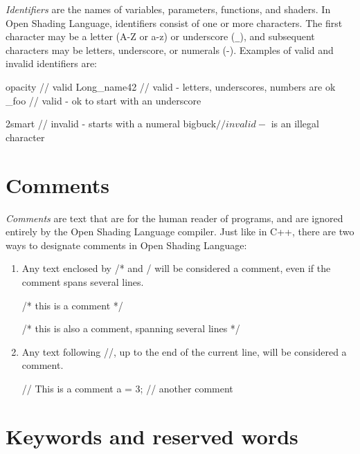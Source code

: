 \documentclass[11pt,letterpaper]{book}
\def\langname{Open Shading Language\xspace}
\begin{document}
\emph{Identifiers} are the names of variables, parameters, functions,
and shaders.  In \langname, identifiers consist of one or more
characters.  The first character may be a letter ({\cf A}-{\cf Z} or
{\cf a}-{\cf z}) or underscore (\verb|_|), and subsequent characters may
be letters, underscore, or numerals ({}-{}).  Examples of
valid and invalid identifiers are:

\begin{code}
    opacity       // valid
    Long_name42   // valid - letters, underscores, numbers are ok
    _foo          // valid - ok to start with an underscore

    2smart        // invalid - starts with a numeral
    bigbuck$      // invalid - $ is an illegal character
\end{code}


\section{Comments}
\label{sec:comments}

\emph{Comments} are text that are for the human reader of programs, and
are ignored entirely by the \langname compiler.  Just like in C++, there
are two ways to designate comments in \langname:

\begin{enumerate}
\item Any text enclosed by {\cf /*} and {\cf */} will be considered
a comment, even if the comment spans several lines.

\begin{code}
    /* this is a comment */

    /* this is also
       a comment, spanning
       several lines */
\end{code}

\item Any text following {\cf //}, up to the end of the current line,
will be considered a comment.

\begin{code}
    // This is a comment
    a = 3;   // another comment
\end{code}
\end{enumerate}


\section{Keywords and reserved words}
\label{sec:lexical:keyreserved}
\end{document}
